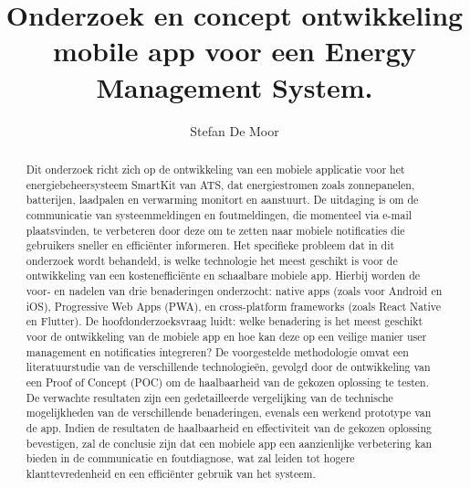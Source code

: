 \documentclass{hogent-article}
\title{Onderzoek en concept ontwikkeling mobile app voor een Energy Management System.}
\author{Stefan De Moor}
\begin{document}
\begin{abstract}
  Dit onderzoek richt zich op de ontwikkeling van een mobiele applicatie voor het energiebeheersysteem SmartKit van ATS, dat energiestromen zoals zonnepanelen, batterijen, laadpalen en verwarming monitort en aanstuurt. De uitdaging is om de communicatie van systeemmeldingen en foutmeldingen, die momenteel via e-mail plaatsvinden, te verbeteren door deze om te zetten naar mobiele notificaties die gebruikers sneller en efficiënter informeren. Het specifieke probleem dat in dit onderzoek wordt behandeld, is welke technologie het meest geschikt is voor de ontwikkeling van een kostenefficiënte en schaalbare mobiele app. Hierbij worden de voor- en nadelen van drie benaderingen onderzocht: native apps (zoals voor Android en iOS), Progressive Web Apps (PWA), en cross-platform frameworks (zoals React Native en Flutter). De hoofdonderzoeksvraag luidt: welke benadering is het meest geschikt voor de ontwikkeling van de mobiele app en hoe kan deze op een veilige manier user management en notificaties integreren? De voorgestelde methodologie omvat een literatuurstudie van de verschillende technologieën, gevolgd door de ontwikkeling van een Proof of Concept (POC) om de haalbaarheid van de gekozen oplossing te testen. De verwachte resultaten zijn een gedetailleerde vergelijking van de technische mogelijkheden van de verschillende benaderingen, evenals een werkend prototype van de app. Indien de resultaten de haalbaarheid en effectiviteit van de gekozen oplossing bevestigen, zal de conclusie zijn dat een mobiele app een aanzienlijke verbetering kan bieden in de communicatie en foutdiagnose, wat zal leiden tot hogere klanttevredenheid en een efficiënter gebruik van het systeem.
\end{abstract}

\tableofcontents



\printbibliography[heading=bibintoc]
\end{document}
